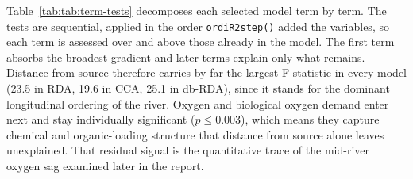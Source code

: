 \documentclass[11pt]{article}
\begin{document}
\begin{table}[!h]
\centering
\caption{\label{tab:tab:model-summary}Selected constrained ordination models.}
\centering
{}
\end{table}
Table~\ref{tab:tab:term-tests} decomposes each selected model term by term. The tests are sequential, applied in the order \texttt{ordiR2step()} added the variables, so each term is assessed over and above those already in the model. The first term absorbs the broadest gradient and later terms explain only what remains. Distance from source therefore carries by far the largest F statistic in every model (23.5 in RDA, 19.6 in CCA, 25.1 in db-RDA), since it stands for the dominant longitudinal ordering of the river. Oxygen and biological oxygen demand enter next and stay individually significant ($p \leq 0.003$), which means they capture chemical and organic-loading structure that distance from source alone leaves unexplained. That residual signal is the quantitative trace of the mid-river oxygen sag examined later in the report.
\begin{table}[!h]
\centering
\caption{\label{tab:tab:term-tests}Permutation tests for terms in selected constrained models.}
\centering
{}
\end{table}
\end{document}
